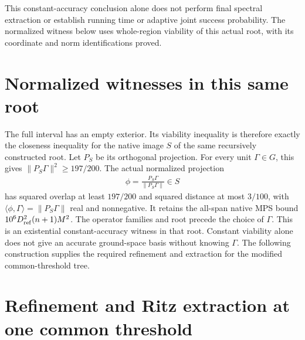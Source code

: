 \documentclass{article}
\begin{document}
This constant-accuracy conclusion alone does not perform final spectral
extraction or establish running time or adaptive joint success probability.
The normalized witness below uses whole-region viability of this actual
root, with its coordinate and norm identifications proved.

\section*{Normalized witnesses in this same root}

The full interval has an empty exterior. Its viability inequality is
therefore exactly the closeness inequality for the native image $S$ of
the same recursively constructed root. Let $P_S$ be its orthogonal
projection. For every unit $\Gamma\in G$, this gives
$\|P_S\Gamma\|^2\ge197/200$. The actual normalized projection
\begin{align}
    \phi=\frac{P_S\Gamma}{\|P_S\Gamma\|}\in S
    \label{eq:alvv_approximation_normalized_witness}
\end{align}
has squared overlap at least $197/200$ and squared distance at most
$3/100$, with $\langle\phi,\Gamma\rangle=\|P_S\Gamma\|$ real and
nonnegative. It retains the all-span native MPS bound
$10^6D_{\rm ref}^2(n+1)M^2$.
The operator families and root precede the choice of $\Gamma$.
This is an existential constant-accuracy witness in that root. Constant
viability alone does not give an accurate ground-space basis without
knowing $\Gamma$. The following construction supplies the required
refinement and extraction for the modified common-threshold tree.


\section*{Refinement and Ritz extraction at one common threshold}
\end{document}
